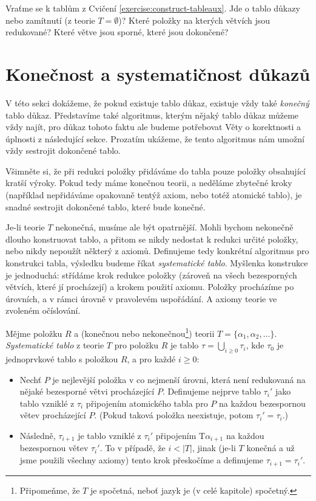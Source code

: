 \begin{exercise}
    Vraťme se k tablům z Cvičení \ref{exercise:construct-tableaux}. Jde o tablo důkazy nebo zamítnutí (z teorie $T=\emptyset$)? Které položky na kterých větvích jsou redukované? Které větve jsou sporné, které jsou dokončené?
\end{exercise}

\section{Konečnost a systematičnost důkazů}\label{section:finiteness-and-systematicity-of-proofs}

V této sekci dokážeme, že pokud existuje tablo důkaz, existuje vždy také \emph{konečný} tablo důkaz. Představíme také algoritmus, kterým nějaký tablo důkaz můžeme vždy najít, pro důkaz tohoto faktu ale budeme potřebovat Věty o korektnosti a úplnosti z následující sekce. Prozatím ukážeme, že tento algoritmus nám umožní vždy sestrojit dokončené tablo.

Všimněte si, že při redukci položky přidáváme do tabla pouze položky obsahující kratší výroky. Pokud tedy máme konečnou teorii, a neděláme zbytečné kroky (například nepřidáváme opakovaně tentýž axiom, nebo totéž atomické tablo), je snadné sestrojit dokončené tablo, které bude konečné.

Je-li teorie $T$ nekonečná, musíme ale být opatrnější. Mohli bychom nekonečně dlouho konstruovat tablo, a přitom se nikdy nedostat k redukci určité položky, nebo nikdy nepoužít některý z axiomů. Definujeme tedy konkrétní algoritmus pro konstrukci tabla, výsledku budeme říkat \emph{systematické tablo}. Myšlenka konstrukce je jednoduchá: střídáme krok redukce položky (zároveň na všech bezesporných větvích, které jí procházejí) a krokem použití axiomu. Položky procházíme po úrovních, a v rámci úrovně v pravolevém uspořádání. A axiomy teorie ve zvoleném očíslování.

\begin{definition}
Mějme položku $R$ a (konečnou nebo nekonečnou\footnote{Připomeňme, že $T$ je spočetná, neboť jazyk je (v celé kapitole) spočetný.}) teorii $T=\{\alpha_1,\alpha_2,\dots\}$. \emph{Systematické tablo} z teorie $T$ pro položku $R$ je tablo $\tau=\bigcup_{i\geq 0}\tau_i$, kde $\tau_0$ je jednoprvkové tablo s položkou $R$, a pro každé $i\geq 0$:

\begin{itemize}
    \item Nechť $P$ je nejlevější položka v co nejmenší úrovni, která není redukovaná na nějaké bezesporné větvi procházející $P$. Definujeme nejprve tablo $\tau_i'$ jako tablo vzniklé z $\tau_i$ připojením atomického tabla pro $P$ na každou bezespornou větev procházející $P$. (Pokud taková položka neexistuje, potom  $\tau_i'=\tau_i$.)
    \item Následně, $\tau_{i+1}$ je tablo vzniklé z $\tau_i'$ připojením $\mathrm{T}\alpha_{i+1}$ na každou bezespornou větev $\tau_i'$. To v případě, že $i<|T|$, jinak (je-li $T$ konečná a už jsme použili všechny axiomy) tento krok přeskočíme a definujeme $\tau_{i+1}=\tau_i'$.
\end{itemize}
\end{definition}

